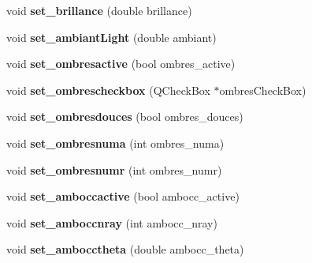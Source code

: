 \begin{DoxyCompactItemize}
\item 
\hypertarget{class_parametres_a17447abf099f7ef44783d8a1b79c7729}{
void {\bfseries set\_\-brillance} (double brillance)}
\label{class_parametres_a17447abf099f7ef44783d8a1b79c7729}

\item 
\hypertarget{class_parametres_a5fd6b4913140b491889ca6948b9f5b7c}{
void {\bfseries set\_\-ambiantLight} (double ambiant)}
\label{class_parametres_a5fd6b4913140b491889ca6948b9f5b7c}

\item 
\hypertarget{class_parametres_afa57983a81ff63ac1af4142f3a676f28}{
void {\bfseries set\_\-ombresactive} (bool ombres\_\-active)}
\label{class_parametres_afa57983a81ff63ac1af4142f3a676f28}

\item 
\hypertarget{class_parametres_a9d8652c7ebc7ffb6dc8f7b66c71b328a}{
void {\bfseries set\_\-ombrescheckbox} (QCheckBox $\ast$ombresCheckBox)}
\label{class_parametres_a9d8652c7ebc7ffb6dc8f7b66c71b328a}

\item 
\hypertarget{class_parametres_a32056c34e447ec31004c6ab9a126f31c}{
void {\bfseries set\_\-ombresdouces} (bool ombres\_\-douces)}
\label{class_parametres_a32056c34e447ec31004c6ab9a126f31c}

\item 
\hypertarget{class_parametres_aef061b9c1b2dbd3f5b9cad492a97fc6e}{
void {\bfseries set\_\-ombresnuma} (int ombres\_\-numa)}
\label{class_parametres_aef061b9c1b2dbd3f5b9cad492a97fc6e}

\item 
\hypertarget{class_parametres_a005d77bcbbe1e9e9edb6c4c55aa7e599}{
void {\bfseries set\_\-ombresnumr} (int ombres\_\-numr)}
\label{class_parametres_a005d77bcbbe1e9e9edb6c4c55aa7e599}

\item 
\hypertarget{class_parametres_acf90351c8a8f03784389a4003d64b87a}{
void {\bfseries set\_\-amboccactive} (bool ambocc\_\-active)}
\label{class_parametres_acf90351c8a8f03784389a4003d64b87a}

\item 
\hypertarget{class_parametres_ae9013a861fb87d29812fec1c2972b7c9}{
void {\bfseries set\_\-amboccnray} (int ambocc\_\-nray)}
\label{class_parametres_ae9013a861fb87d29812fec1c2972b7c9}

\item 
\hypertarget{class_parametres_a95265a8deb7db5b8d510254c055655a6}{
void {\bfseries set\_\-ambocctheta} (double ambocc\_\-theta)}
\label{class_parametres_a95265a8deb7db5b8d510254c055655a6}


\end{DoxyCompactItemize}
